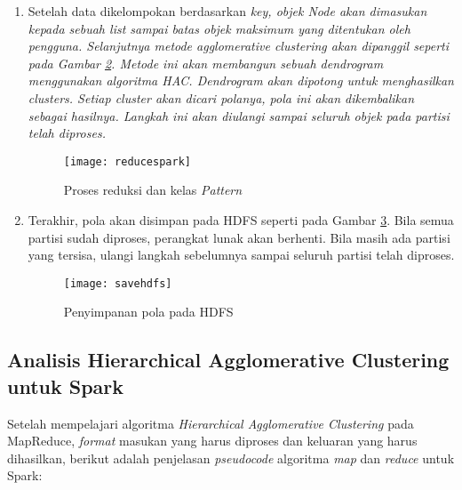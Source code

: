 \begin{enumerate}
\begin{figure}[H]
    \centering  
    \texttt{[image: rddsort]}  
    \caption[Pengelompokkan \it{Node} berdasarkan \it{key}]{Pengelompokkan \it{Node} berdasarkan \it{key}} 
    \label{fig:rddsort} 
\end{figure}

\item Setelah data dikelompokan berdasarkan \it{key}, objek \it{Node} akan dimasukan kepada sebuah \it{list} sampai batas objek maksimum yang ditentukan oleh pengguna. Selanjutnya metode \textit{agglomerative clustering} akan dipanggil seperti pada Gambar \ref{fig:reducespark}. Metode ini akan membangun sebuah \textit{dendrogram} menggunakan algoritma HAC. \textit{Dendrogram} akan dipotong untuk menghasilkan \textit{clusters}. Setiap cluster akan dicari polanya, pola ini akan dikembalikan sebagai hasilnya. Langkah ini akan diulangi sampai seluruh objek pada partisi telah diproses.

\begin{figure}[H]
    \centering  
    \texttt{[image: reducespark]}  
    \caption[Proses reduksi dan kelas \textit{Pattern}]{Proses reduksi dan kelas \textit{Pattern}} 
    \label{fig:reducespark} 
\end{figure}


\item Terakhir, pola akan disimpan pada HDFS seperti pada Gambar \ref{fig:savehdfs}. Bila semua partisi sudah diproses, perangkat lunak akan berhenti. Bila masih ada partisi yang tersisa, ulangi langkah sebelumnya sampai seluruh partisi telah diproses.

\begin{figure}[H]
    \centering  
    \texttt{[image: savehdfs]}  
    \caption[Penyimpanan pola pada HDFS]{Penyimpanan pola pada HDFS} 
    \label{fig:savehdfs} 
\end{figure}

\end{enumerate}

\subsection{Analisis Hierarchical Agglomerative Clustering untuk Spark}

Setelah mempelajari algoritma \textit{Hierarchical Agglomerative Clustering} pada MapReduce, \textit{format} masukan yang harus diproses dan keluaran yang harus dihasilkan, berikut adalah penjelasan \textit{pseudocode} algoritma \textit{map} dan \textit{reduce} untuk Spark:\\

